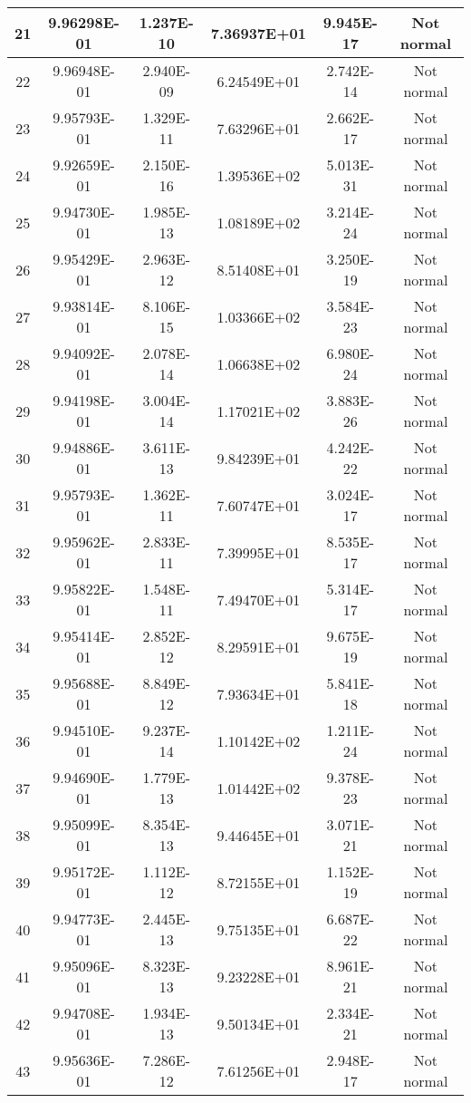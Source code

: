 \begin{table}[h]
\begin{tabular}{|c|c|c|c|c|c|}
		21 & 9.96298E-01 & 1.237E-10 & 7.36937E+01 & 9.945E-17 & Not normal\\\hline
		22 & 9.96948E-01 & 2.940E-09 & 6.24549E+01 & 2.742E-14 & Not normal\\\hline
		23 & 9.95793E-01 & 1.329E-11 & 7.63296E+01 & 2.662E-17 & Not normal\\\hline
		24 & 9.92659E-01 & 2.150E-16 & 1.39536E+02 & 5.013E-31 & Not normal\\\hline
		25 & 9.94730E-01 & 1.985E-13 & 1.08189E+02 & 3.214E-24 & Not normal\\\hline
		26 & 9.95429E-01 & 2.963E-12 & 8.51408E+01 & 3.250E-19 & Not normal\\\hline
		27 & 9.93814E-01 & 8.106E-15 & 1.03366E+02 & 3.584E-23 & Not normal\\\hline
		28 & 9.94092E-01 & 2.078E-14 & 1.06638E+02 & 6.980E-24 & Not normal\\\hline
		29 & 9.94198E-01 & 3.004E-14 & 1.17021E+02 & 3.883E-26 & Not normal\\\hline
		30 & 9.94886E-01 & 3.611E-13 & 9.84239E+01 & 4.242E-22 & Not normal\\\hline
		31 & 9.95793E-01 & 1.362E-11 & 7.60747E+01 & 3.024E-17 & Not normal\\\hline
		32 & 9.95962E-01 & 2.833E-11 & 7.39995E+01 & 8.535E-17 & Not normal\\\hline
		33 & 9.95822E-01 & 1.548E-11 & 7.49470E+01 & 5.314E-17 & Not normal\\\hline
		34 & 9.95414E-01 & 2.852E-12 & 8.29591E+01 & 9.675E-19 & Not normal\\\hline
		35 & 9.95688E-01 & 8.849E-12 & 7.93634E+01 & 5.841E-18 & Not normal\\\hline
		36 & 9.94510E-01 & 9.237E-14 & 1.10142E+02 & 1.211E-24 & Not normal\\\hline
		37 & 9.94690E-01 & 1.779E-13 & 1.01442E+02 & 9.378E-23 & Not normal\\\hline
		38 & 9.95099E-01 & 8.354E-13 & 9.44645E+01 & 3.071E-21 & Not normal\\\hline
		39 & 9.95172E-01 & 1.112E-12 & 8.72155E+01 & 1.152E-19 & Not normal\\\hline
		40 & 9.94773E-01 & 2.445E-13 & 9.75135E+01 & 6.687E-22 & Not normal\\\hline
		41 & 9.95096E-01 & 8.323E-13 & 9.23228E+01 & 8.961E-21 & Not normal\\\hline
		42 & 9.94708E-01 & 1.934E-13 & 9.50134E+01 & 2.334E-21 & Not normal\\\hline
		43 & 9.95636E-01 & 7.286E-12 & 7.61256E+01 & 2.948E-17 & Not normal\\\hline

\end{tabular}
\end{table}
